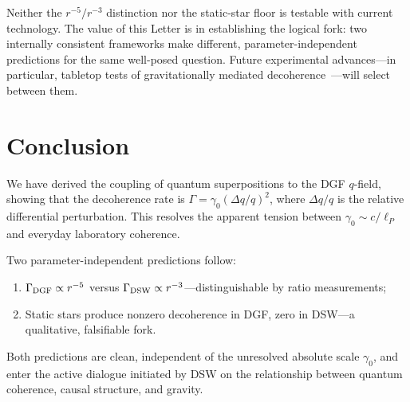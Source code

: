 \documentclass[aps,prl,twocolumn,showpacs,superscriptaddress,preprintnumbers]{revtex4-2}
\begin{document}
Neither the $r^{-5}/r^{-3}$ distinction nor the static-star floor is testable with current technology.
The value of this Letter is in establishing the logical fork:
two internally consistent frameworks make different, parameter-independent predictions for the same well-posed question.
Future experimental advances---in particular, tabletop tests of gravitationally mediated decoherence~\cite{Biggs:2024}---will select between them.

\section{Conclusion}

We have derived the coupling of quantum superpositions to the DGF $q$-field, showing that the decoherence rate is $\Gamma=\gamma_0(\Delta q/q)^2$, where $\Delta q/q$ is the relative differential perturbation.
This resolves the apparent tension between $\gamma_0\sim c/\ell_P$ and everyday laboratory coherence.

Two parameter-independent predictions follow:
\begin{enumerate}
    \item $\Gamma_{\rm DGF}\propto r^{-5}$ versus $\Gamma_{\rm DSW}\propto r^{-3}$---distinguishable by ratio measurements;
    \item Static stars produce nonzero decoherence in DGF, zero in DSW---a qualitative, falsifiable fork.
\end{enumerate}

Both predictions are clean, independent of the unresolved absolute scale $\gamma_0$, and enter the active dialogue initiated by DSW on the relationship between quantum coherence, causal structure, and gravity.
\end{document}

